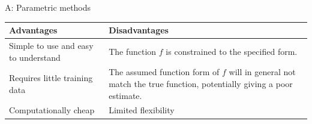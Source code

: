 \documentclass[ignorenonframetext,]{beamer}
\begin{document}
\begin{frame}

\begin{block}{A: Parametric methods}

\begin{longtable}[]{@{}ll@{}}
\toprule
\begin{minipage}[b]{0.47\columnwidth}\raggedright\strut
Advantages\strut
\end{minipage} & \begin{minipage}[b]{0.47\columnwidth}\raggedright\strut
Disadvantages\strut
\end{minipage}\tabularnewline
\midrule
\endhead
\begin{minipage}[t]{0.47\columnwidth}\raggedright\strut
Simple to use and easy to understand\strut
\end{minipage} & \begin{minipage}[t]{0.47\columnwidth}\raggedright\strut
The function \(f\) is constrained to the specified
form.\vspace{2mm}\strut
\end{minipage}\tabularnewline
\begin{minipage}[t]{0.47\columnwidth}\raggedright\strut
Requires little training data\strut
\end{minipage} & \begin{minipage}[t]{0.47\columnwidth}\raggedright\strut
The assumed function form of \(f\) will in general not match the true
function, potentially giving a poor estimate.\vspace{2mm}\strut
\end{minipage}\tabularnewline
\begin{minipage}[t]{0.47\columnwidth}\raggedright\strut
Computationally cheap\strut
\end{minipage} & \begin{minipage}[t]{0.47\columnwidth}\raggedright\strut
Limited flexibility\strut
\end{minipage}\tabularnewline
\bottomrule
\end{longtable}

\end{block}

\end{frame}
\end{document}
